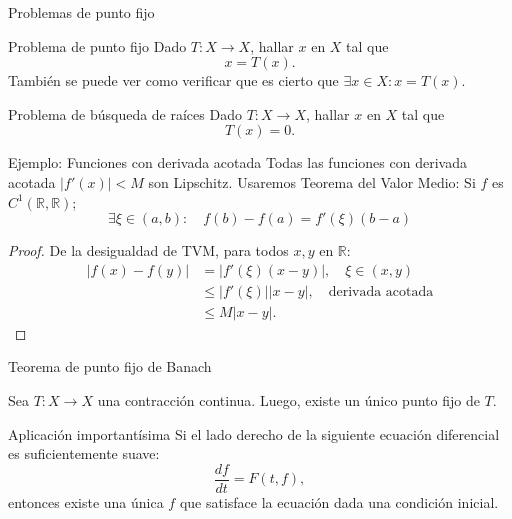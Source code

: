 \documentclass[12pt,aspectratio=169,xcolor=dvipsnames]{beamer}
\newcommand{\R}{\mathbb{R}}
\begin{document}
\begin{frame}{Problemas de punto fijo}
    \begin{block}{Problema de punto fijo}
        Dado $T:X\to X$, hallar $x$ en $X$ tal que
            $$ x = T(x).$$
        También se puede ver como verificar que es cierto que $\exists x\in X: x=T(x)$.
    \end{block}

    \pause \begin{block}{Problema de búsqueda de raíces}
        Dado $T:X\to X$, hallar $x$ en $X$ tal que
            $$ T(x)=0.$$
    \end{block}
\end{frame}
\begin{frame}{Ejemplo: Funciones con derivada acotada}
    Todas las funciones con derivada acotada $|f'(x)|<M$ son Lipschitz.
    Usaremos Teorema del Valor Medio: Si $f$ es $C^1(\R,\R)$; 
            $$ \exists \xi \in (a,b): \quad f(b) - f(a) = f'(\xi)(b-a) $$
    \pause \begin{proof}
        De la desigualdad de TVM, para todos $x,y$ en $\R$:
        \begin{align*}
            |f(x) - f(y)| &= |f'(\xi)(x-y)|, \quad \xi \in (x,y) \\
                          &\leq |f'(\xi)| |x-y|, \quad \text{derivada acotada} \\
                        &\leq M |x-y|.
        \end{align*}
    \end{proof}
\end{frame}
\begin{frame}{Teorema de punto fijo de Banach}
    \begin{block}{}
        Sea $T:X\to X$ una contracción continua. Luego, existe un único punto fijo de $T$. 
    \end{block}
\end{frame}
\begin{frame}{Aplicación importantísima}
    Si el lado derecho de la siguiente ecuación diferencial es suficientemente suave: 
        $$ \frac{d f }{dt} = F(t, f), $$
    entonces existe una única $f$ que satisface la ecuación dada una condición inicial. 

\end{frame}
\end{document}
